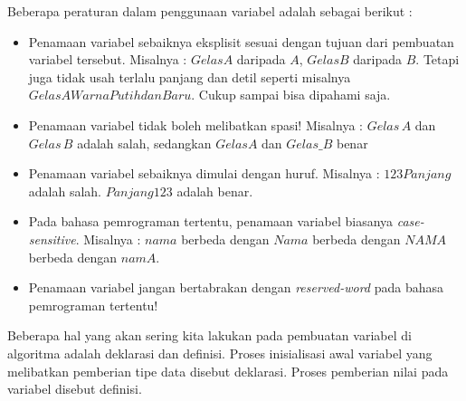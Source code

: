 Beberapa peraturan dalam penggunaan variabel adalah sebagai berikut : 
\begin{itemize}
	\item Penamaan variabel sebaiknya eksplisit sesuai dengan tujuan dari pembuatan variabel tersebut. Misalnya : $GelasA$ daripada $A$, $GelasB$ daripada $B$. Tetapi juga tidak usah terlalu panjang dan detil seperti misalnya $GelasAWarnaPutihdanBaru$. Cukup sampai bisa dipahami saja.
	\item	Penamaan variabel tidak boleh melibatkan spasi!  Misalnya : $Gelas\,A$ dan $Gelas\,B$ adalah salah, sedangkan $GelasA$ dan $Gelas\_B$ benar
	\item	Penamaan variabel sebaiknya dimulai dengan huruf. Misalnya : $123Panjang$ adalah salah. $Panjang123$ adalah benar. 
	\item	Pada bahasa pemrograman tertentu, penamaan variabel biasanya \textit{case-sensitive}. Misalnya : $nama$ berbeda dengan $Nama$ berbeda dengan $NAMA$ berbeda dengan $namA$.
	\item	Penamaan variabel jangan bertabrakan dengan \textit{reserved-word} pada bahasa pemrograman tertentu!
\end{itemize}

Beberapa hal yang akan sering kita lakukan pada pembuatan variabel di algoritma adalah deklarasi dan definisi. Proses inisialisasi awal variabel yang melibatkan pemberian tipe data disebut deklarasi. Proses pemberian nilai pada variabel disebut definisi.


